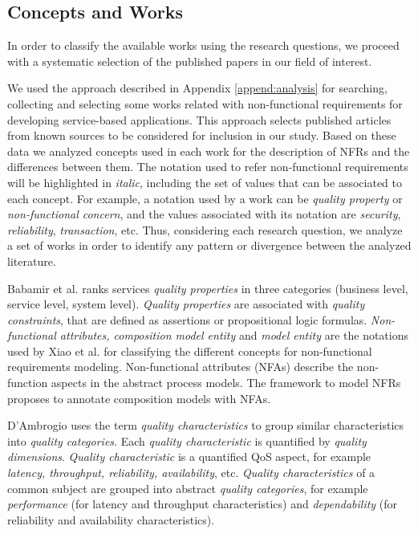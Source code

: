  
\subsection{Concepts and Works}
\label{subsec:nfr_concepts}

In order to classify the available works using the research questions, we
proceed with a systematic selection of the published papers in our field of
interest.

We used the approach described in Appendix \ref{append:analysis} for searching,
collecting and selecting some works related with non-functional requirements for
developing service-based applications. This approach selects published articles
from known sources to be considered for inclusion in our study. Based on these
data we analyzed concepts used in each work for the description of NFRs and the
differences between them. The notation used to refer non-functional
requirements will be highlighted in \textit{italic}, including the set of values
that can be associated to each concept. For example, a notation used by a work
can be \textit{quality property} or \textit{non-functional concern}, and the values associated with
its notation are \textit{security}, \textit{reliability}, \textit{transaction},
etc. Thus, considering each research question, we analyze a set of works in
order to identify any pattern or divergence between the analyzed literature. 


\bigskip
\bigskip

Babamir et al.\cite{Babamir2010} ranks services \textit{quality properties}
in three categories (business level, service level, system level).
\textit{Quality properties} are associated with \textit{quality constraints},
that are defined as assertions or propositional logic formulas.
\textit{Non-functional attributes, composition model entity} and \textit{model entity} are the notations used by
Xiao et al. \cite{XiaoCZBOLH08} for classifying the different concepts for
non-functional requirements modeling. Non-functional attributes (NFAs) describe
the non-function aspects in the abstract process models. The framework to
model NFRs proposes to annotate composition models with NFAs.

D'Ambrogio \cite{DAmbrogio06} uses the term \textit{quality characteristics}
to group similar characteristics into \textit{quality categories}. Each
\textit{quality characteristic} is quantified by \textit{quality dimensions}.
\textit{Quality characteristic} is a quantified QoS aspect, for example
\textit{latency, throughput, reliability, availability}, etc. \textit{Quality
characteristics} of a common subject are grouped into abstract \textit{quality
categories}, for example \textit{performance} (for latency and throughput characteristics) and
\textit{dependability} (for reliability and availability characteristics).  
 
